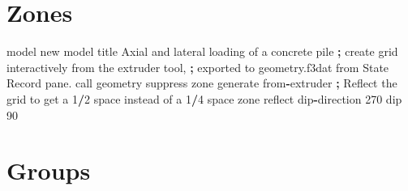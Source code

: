 \documentclass[a4paper, nobind]{templates/ociamthesis}
\newenvironment{Shaded}{\begin{snugshade}}{\end{snugshade}}
\newcommand{\DecValTok}[1]{\textcolor[rgb]{0.00,0.00,0.81}{#1}}
\newcommand{\ImportTok}[1]{#1}
\newcommand{\NormalTok}[1]{#1}
\newcommand{\OperatorTok}[1]{\textcolor[rgb]{0.81,0.36,0.00}{\textbf{#1}}}
\newcommand{\StringTok}[1]{\textcolor[rgb]{0.31,0.60,0.02}{#1}}
\renewenvironment{Shaded}
{
  \vspace{10pt}%
  \begin{snugshade}%
}{%
  \end{snugshade}%
  \vspace{8pt}%
}
\begin{document}
\hypertarget{zones-1}{%
\section{Zones}\label{zones-1}}

\begin{Shaded}
\begin{Highlighting}[]
\NormalTok{model new}
\NormalTok{model title }\StringTok{\textquotesingle{}Axial and lateral loading of a concrete pile\textquotesingle{}}
\OperatorTok{;}\NormalTok{ create grid interactively }\ImportTok{from}\NormalTok{ the extruder tool, }
\OperatorTok{;}\NormalTok{ exported to geometry.f3dat }\ImportTok{from}\NormalTok{ State Record pane.}
\NormalTok{call }\StringTok{\textquotesingle{}geometry\textquotesingle{}}\NormalTok{ suppress}
\NormalTok{zone generate }\ImportTok{from}\OperatorTok{{-}}\NormalTok{extruder}
\OperatorTok{;}\NormalTok{ Reflect the grid to get a }\DecValTok{1}\OperatorTok{/}\DecValTok{2}\NormalTok{ space instead of a }\DecValTok{1}\OperatorTok{/}\DecValTok{4}\NormalTok{ space}
\NormalTok{zone reflect dip}\OperatorTok{{-}}\NormalTok{direction }\DecValTok{270}\NormalTok{ dip }\DecValTok{90}
\end{Highlighting}
\end{Shaded}

\hypertarget{groups}{%
\section{Groups}\label{groups}}
\end{document}
